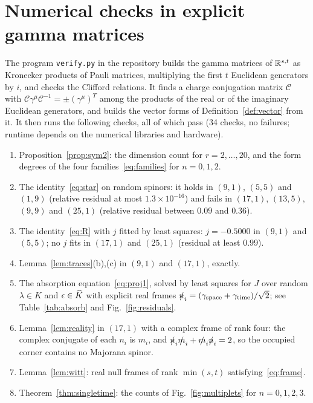 \section{Numerical checks in explicit gamma matrices}
\label{app:checks}

The program \texttt{verify.py} in the repository builds the gamma matrices of $\mathbb{R}^{s,t}$ as Kronecker products of Pauli matrices, multiplying the first $t$ Euclidean generators by $i$, and checks the Clifford relations. It finds a charge conjugation matrix $\mathcal C$ with $\mathcal C\gamma^\mu\mathcal C^{-1}=\pm(\gamma^\mu)^T$ among the products of the real or of the imaginary Euclidean generators, and builds the vector forms of Definition~\ref{def:vector} from it. It then runs the following checks, all of which pass (34 checks, no failures; runtime depends on the numerical libraries and hardware).
\begin{enumerate}[label=(\alph*)]
\item Proposition~\ref{prop:sym2}: the dimension count for $r=2,\dots,20$, and the form degrees of the four families~\eqref{eq:families} for $n=0,1,2$.
\item The identity~\eqref{eq:star} on random spinors: it holds in $(9,1)$, $(5,5)$ and $(1,9)$ (relative residual at most $1.3\times10^{-16}$) and fails in $(17,1)$, $(13,5)$, $(9,9)$ and $(25,1)$ (relative residual between $0.09$ and $0.36$).
\item The identity~\eqref{eq:R} with $j$ fitted by least squares: $j=-0.5000$ in $(9,1)$ and $(5,5)$; no $j$ fits in $(17,1)$ and $(25,1)$ (residual at least $0.99$).
\item Lemma~\ref{lem:traces}(b),(c) in $(9,1)$ and $(17,1)$, exactly.
\item The absorption equation~\eqref{eq:proj1}, solved by least squares for $J$ over random $\lambda\in K$ and $\epsilon\in\widehat{K}$ with explicit real frames $\slashed{n}_i=(\gamma_{\text{space}}+\gamma_{\text{time}})/\sqrt2$; see Table~\ref{tab:absorb} and Fig.~\ref{fig:residuals}.
\item Lemma~\ref{lem:reality} in $(17,1)$ with a complex frame of rank four: the complex conjugate of each $n_i$ is $m_i$, and $\slashed{n}_i\slashed{m}_i+\slashed{m}_i\slashed{n}_i=2$, so the occupied corner contains no Majorana spinor.
\item Lemma~\ref{lem:witt}: real null frames of rank $\min(s,t)$ satisfying~\eqref{eq:frame}.
\item Theorem~\ref{thm:singletime}: the counts of Fig.~\ref{fig:multiplets} for $n=0,1,2,3$.
\end{enumerate}

